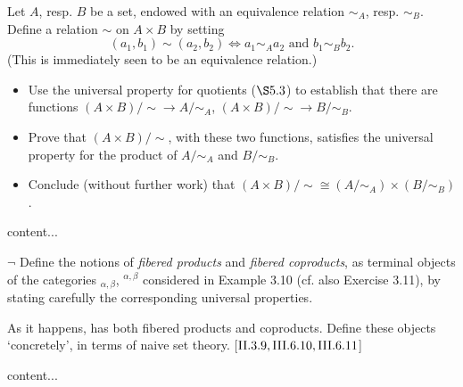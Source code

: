 \begin{exercise}
	Let \(A\), resp. \(B\) be a set, endowed with an equivalence relation \(\sim_A\), resp. \(\sim_B\). Define a relation \(\sim\) on \(A \times B\) by setting
	\begin{equation*}
		(a_1, b_1) \sim (a_2, b_2) \iff a_1 \sim_A a_2 \text{ and } b_1 \sim_B b_2.
	\end{equation*}
	(This is immediately seen to be an equivalence relation.)
	\begin{itemize}
		\item Use the universal property for quotients (\(\S 5.3\)) to establish that there are functions
		\((A \times B)/{\sim} \to A/{\sim}_A\), \((A \times B)/{\sim} \to B/{\sim}_B\).
		\item Prove that \((A \times B)/{\sim}\), with these two functions, satisfies the universal property
		for the product of \(A/{\sim}_A\) and \(B/{\sim}_B\).
		\item Conclude (without further work) that \((A \times B)/{\sim} \cong (A/{\sim}_A) \times (B/{\sim}_B)\).
	\end{itemize}
\end{exercise}
\begin{solution}
	content...
\end{solution}

\begin{exercise}
	\(\neg\) Define the notions of \textit{fibered products} and \textit{fibered coproducts}, as terminal objects of the categories \(_{\alpha,\beta}\), \(^{\alpha,\beta}\) considered in Example 3.10 (cf. also Exercise 3.11), by stating carefully the corresponding universal properties.
	
	As it happens,  has both fibered products and coproducts. Define these objects ‘concretely’, in terms of naive set theory. [\(\RN{2}.3.9, \RN{3}.6.10, \RN{3}.6.11\)]
\end{exercise}
\begin{solution}
	content...
\end{solution}